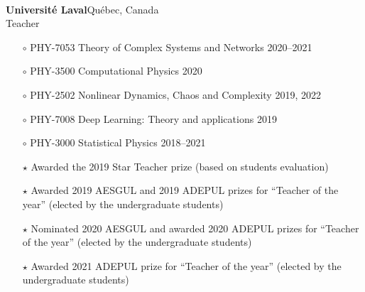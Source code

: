 \documentclass[11pt]{article}
\newlength{\BoxWidth}
\newcommand{\TitreA}[1]{\colorbox{background}{\makebox[\BoxWidth][c]{\Large\textrm{\textsc{#1}}}}\vspace{0.75\baselineskip}\\}
\begin{document}
%
%
%
%
%
\TitreA{Teaching}
%
\textbf{Universit\'e Laval}\hfill Qu\'ebec, Canada\\
Teacher
\begin{itemize}[noitemsep, leftmargin=1.5em, topsep=0pt, after=\vspace{0.75\baselineskip}]\small
  \item[$\circ$] PHY-7053 Theory of Complex Systems and Networks \hfill 2020--2021
  \item[$\circ$] PHY-3500 Computational Physics \hfill 2020
  \item[$\circ$] PHY-2502 Nonlinear Dynamics, Chaos and Complexity \hfill 2019, 2022%
  \item[$\circ$] PHY-7008 Deep Learning: Theory and applications \hfill 2019%
  \item[$\circ$] PHY-3000 Statistical Physics \hfill 2018--2021
  \item[$\star$] Awarded the 2019 Star Teacher prize (based on students evaluation)
  \item[$\star$] Awarded 2019 AESGUL and 2019 ADEPUL prizes for ``Teacher of the year'' (elected by the undergraduate students)
  \item[$\star$] Nominated 2020 AESGUL and awarded 2020 ADEPUL prizes for ``Teacher of the year'' (elected by the undergraduate students)
  \item[$\star$] Awarded 2021 ADEPUL prize for ``Teacher of the year'' (elected by the undergraduate students)
\end{itemize}\vspace{0.75\baselineskip}%
%
\end{document}

